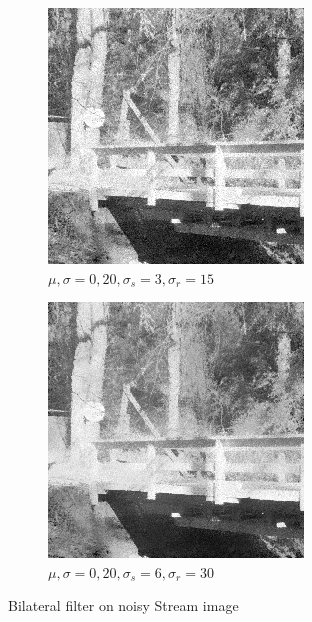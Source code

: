 \documentclass[a4paper, landscape]{article}
\begin{document}
\begin{figure}
    \centering
    \begin{subfigure}{0.48\linewidth}
        \centering
        \includegraphics[width=\linewidth]{stream,σ_noise20,σ_spatial3,σ_range15.png}
        \caption{$\mu, \sigma = 0, 20, \sigma_s=3, \sigma_r=15$}
    \end{subfigure}
    \begin{subfigure}{0.48\linewidth}
        \centering
        \includegraphics[width=\linewidth]{stream,σ_noise20,σ_spatial6,σ_range30.png}
        \caption{$\mu, \sigma = 0, 20, \sigma_s=6, \sigma_r=30$}
    \end{subfigure}
    \caption{Bilateral filter on noisy Stream image}
    \label{fig:kn}
\end{figure}
\end{document}
